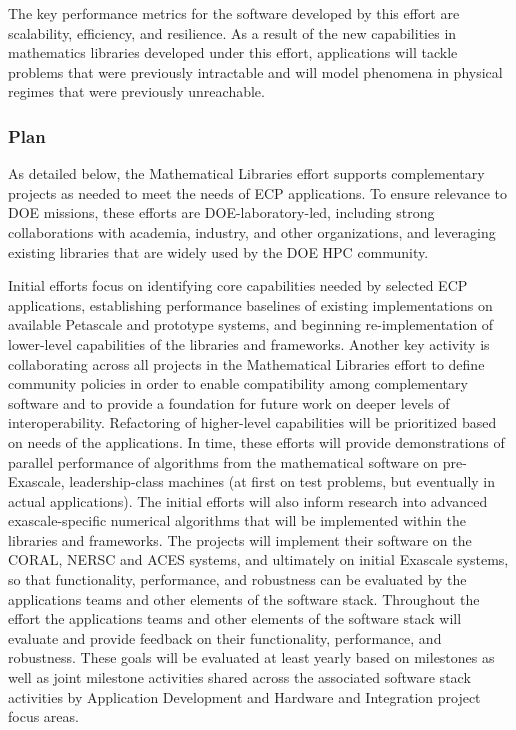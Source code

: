 The key performance metrics for the software developed by this effort are scalability, efficiency, and resilience. As a result of the new capabilities in mathematics libraries developed under this effort, applications will tackle problems that were previously intractable and will model phenomena in physical regimes that were previously unreachable.

\subsubsection{Plan}
As detailed below, the Mathematical Libraries effort supports complementary projects as needed to meet the needs of ECP applications. To ensure relevance to DOE missions, these efforts are DOE-laboratory-led, including strong collaborations with academia, industry, and other organizations, and leveraging existing libraries that are widely used by the DOE HPC community. 

Initial efforts focus on identifying core capabilities needed by selected ECP applications, establishing performance baselines of existing implementations on available Petascale and prototype systems, and beginning re-implementation of lower-level capabilities of the libraries and frameworks. Another key activity is collaborating across all projects in the Mathematical Libraries effort to define community policies in order to enable compatibility among complementary software and to provide a foundation for future work on deeper levels of interoperability. Refactoring of higher-level capabilities will be prioritized based on needs of the applications. In time, these efforts will provide demonstrations of parallel performance of algorithms from the mathematical software on pre-Exascale, leadership-class machines (at first on test problems, but eventually in actual applications). The initial efforts will also inform research into advanced exascale-specific numerical algorithms that will be implemented within the libraries and frameworks. The projects will implement their software on the CORAL, NERSC and ACES systems, and ultimately on initial Exascale systems, so that functionality, performance, and robustness can be evaluated by the applications teams and other elements of the software stack. Throughout the effort the applications teams and other elements of the software stack will evaluate and provide feedback on their functionality, performance, and robustness. These goals will be evaluated at least yearly based on milestones as well as joint milestone activities shared across the associated software stack activities by Application Development and Hardware and Integration project focus areas.

